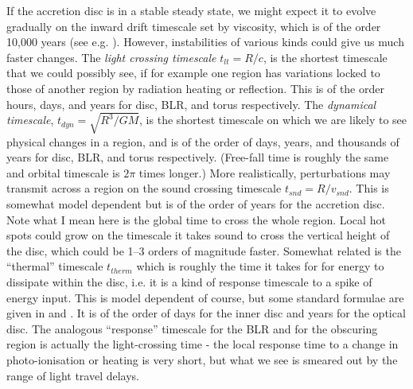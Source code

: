 \documentclass[11pt]{article}
\begin{document}
If the accretion disc is in a stable steady state, we might expect it
to evolve gradually on the inward drift timescale set by viscosity,
which is of the order 10,000 years (see
e.g. \citet{Netzer2013}). However, instabilities of various kinds
could give us much faster changes. The {\em light crossing timescale}
$t_{lt}=R/c$, is the shortest timescale that we could possibly see, if
for example one region has variations locked to those of another
region by radiation heating or reflection. This is of the order hours,
days, and years for disc, BLR, and torus respectively. The {\em
dynamical timescale}, $t_{dyn}=\sqrt{R^3/GM}$, is the shortest
timescale on which we are likely to see physical changes in a region,
and is of the order of days, years, and thousands of years for disc,
BLR, and torus respectively. (Free-fall time is roughly the same and
orbital timescale is $2\pi$ times longer.) More realistically,
perturbations may transmit across a region on the sound crossing
timescale $t_{snd}= R/ v_{snd}$. This is somewhat model dependent but
is of the order of years for the accretion disc. Note what I mean here
is the global time to cross the whole region. Local hot spots could
grow on the timescale it takes sound to cross the vertical height of
the disc, which could be 1--3 orders of magnitude faster. Somewhat
related is the ``thermal'' timescale $t_{therm}$ which is roughly the
time it takes for for energy to dissipate within the disc, i.e. it is
a kind of response timescale to a spike of energy input. This is model
dependent of course, but some standard formulae are given in
\citet{Collier2001a} and \citet{Kelly2009}. It is of the order of days
for the inner disc and years for the optical disc.  The analogous
``response'' timescale for the BLR and for the obscuring region is
actually the light-crossing time - the local response time to a change
in photo-ionisation or heating is very short, but what we see is
smeared out by the range of light travel delays.
\end{document}
